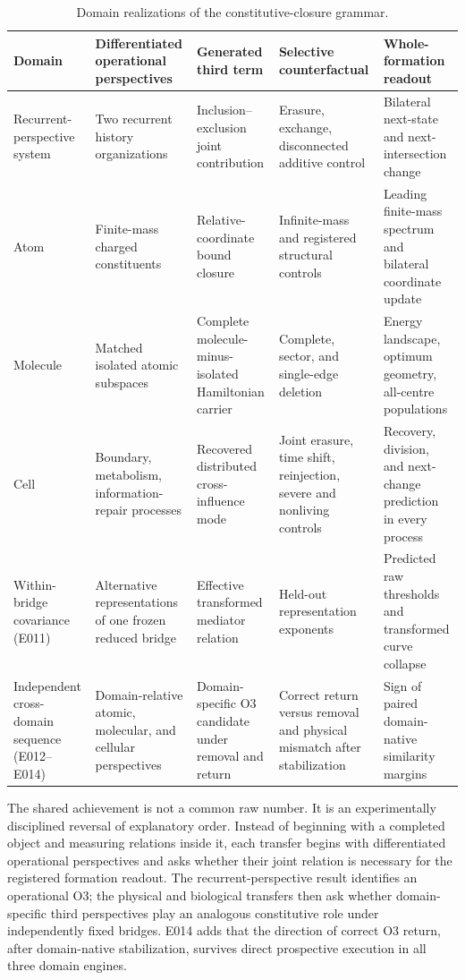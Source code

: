 \documentclass[11pt,a4paper]{article}
\begin{document}
\begin{table}[H]
\centering
\scriptsize
\caption{Domain realizations of the constitutive-closure grammar.}
\label{tab:cross-domain-map}
\begin{tabularx}{\textwidth}{@{}>{\raggedright\arraybackslash}p{1.45cm}>{\raggedright\arraybackslash}p{3.05cm}>{\raggedright\arraybackslash}p{3.25cm}>{\raggedright\arraybackslash}p{3.25cm}>{\raggedright\arraybackslash}X@{}}
\toprule
Domain & Differentiated operational perspectives & Generated third term & Selective counterfactual & Whole-formation readout \\
\midrule
Recurrent-perspective system & Two recurrent history organizations & Inclusion--exclusion joint contribution & Erasure, exchange, disconnected additive control & Bilateral next-state and next-intersection change \\
Atom & Finite-mass charged constituents & Relative-coordinate bound closure & Infinite-mass and registered structural controls & Leading finite-mass spectrum and bilateral coordinate update \\
Molecule & Matched isolated atomic subspaces & Complete molecule-minus-isolated Hamiltonian carrier & Complete, sector, and single-edge deletion & Energy landscape, optimum geometry, all-centre populations \\
Cell & Boundary, metabolism, information-repair processes & Recovered distributed cross-influence mode & Joint erasure, time shift, reinjection, severe and nonliving controls & Recovery, division, and next-change prediction in every process \\
Within-bridge covariance (E011) & Alternative representations of one frozen reduced bridge & Effective transformed mediator relation & Held-out representation exponents & Predicted raw thresholds and transformed curve collapse \\
Independent cross-domain sequence (E012--E014) & Domain-relative atomic, molecular, and cellular perspectives & Domain-specific O3 candidate under removal and return & Correct return versus removal and physical mismatch after stabilization & Sign of paired domain-native similarity margins \\
\bottomrule
\end{tabularx}
\end{table}

The shared achievement is not a common raw number. It is an experimentally disciplined reversal of explanatory order. Instead of beginning with a completed object and measuring relations inside it, each transfer begins with differentiated operational perspectives and asks whether their joint relation is necessary for the registered formation readout. The recurrent-perspective result identifies an operational O3; the physical and biological transfers then ask whether domain-specific third perspectives play an analogous constitutive role under independently fixed bridges. E014 adds that the direction of correct O3 return, after domain-native stabilization, survives direct prospective execution in all three domain engines.
\end{document}
